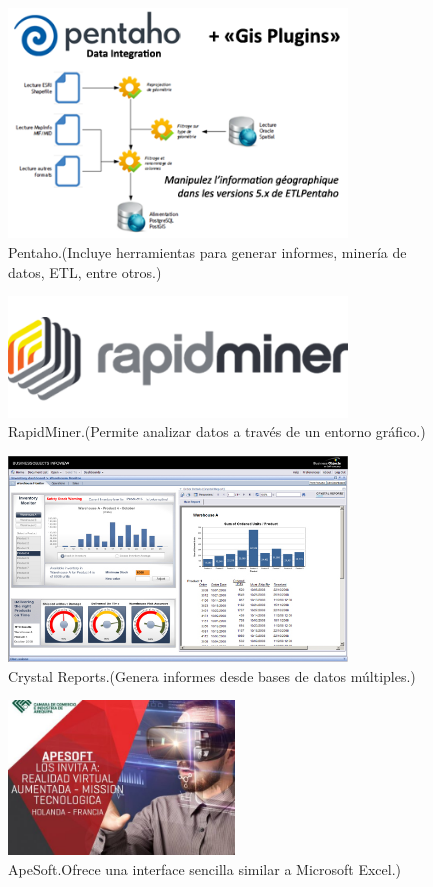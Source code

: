 \documentclass[a4paper,12pt,twocolumn]{article}
\begin{document}
\begin{figure}[h!]
\centering
\includegraphics[width=9cm]{./Imagenes/BIimagen15}
\caption{\label{fig:01}Pentaho.(Incluye herramientas para generar informes, minería de datos, ETL, entre otros.)}
\end{figure}

\begin{figure}[h!]
\centering
\includegraphics[width=9cm]{./Imagenes/BIimagen16}
\caption{\label{fig:01}RapidMiner.(Permite analizar datos a través de un entorno gráfico.)}
\end{figure}

\begin{figure}[h!]
\centering
\includegraphics[width=9cm]{./Imagenes/BIimagen17}
\caption{\label{fig:01}Crystal Reports.(Genera informes desde bases de datos múltiples.)}
\end{figure}

\begin{figure}[h!]
\centering
\includegraphics[width=6cm]{./Imagenes/BIimagen18}
\caption{\label{fig:01}ApeSoft.Ofrece una interface sencilla similar a Microsoft Excel.)}
\end{figure}
\end{document}
